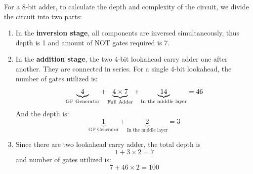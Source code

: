 \documentclass[conference]{IEEEtran}
\begin{document}
For a 8-bit adder, to calculate the depth and complexity of the circuit, we divide the circuit into two parts:
\begin{enumerate}
    \item In the \textbf{inversion stage}, all components are inversed simultaneously, thus depth is 1 and amount of NOT gates required is 7.
    \item In the \textbf{addition stage}, the two 4-bit lookahead carry adder one after another. They are connected in series.
          For a single 4-bit lookahead, the number of gates utilized is:
          \begin{equation}
            \underbrace{4 \time 2}_{\text{GP Generator}} + \underbrace{4 \times 7}_{\text{Full Adder}} + \underbrace{14}_{\text{In the middle layer}} = 46 
          \end{equation} 
          And the depth is:
          \begin{equation}
            \underbrace{1}_{\text{GP Generator}} + \underbrace{2}_{\text{In the middle layer}}  =3 
          \end{equation}

    \item Since there are two lookahead carry adder, the total depth is
     \begin{equation}
        1 + 3 \times 2 = 7
     \end{equation}
     and number of gates utilized is:
     \begin{equation}
        7 + 46 \times 2 = 100
     \end{equation}
\end{enumerate}
\end{document}
